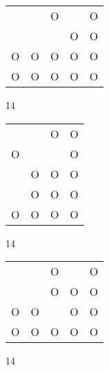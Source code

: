 \begin{tabular}{|m{0.2cm}m{0.2cm}m{0.2cm}m{0.2cm}m{0.2cm}|}\hline
 & &O& &O\\
 & & &O&O\\
O&O&O&O&O\\
O&O&O&O&O\\
\hline\end{tabular}14
\begin{tabular}{|m{0.2cm}m{0.2cm}m{0.2cm}m{0.2cm}|}\hline
 & &O&O\\
O& & &O\\
 &O&O&O\\
 &O&O&O\\
O&O&O&O\\
\hline\end{tabular}14
\begin{tabular}{|m{0.2cm}m{0.2cm}m{0.2cm}m{0.2cm}m{0.2cm}|}\hline
 & &O& &O\\
 & &O&O&O\\
O&O& &O&O\\
O&O&O&O&O\\
\hline\end{tabular}14
